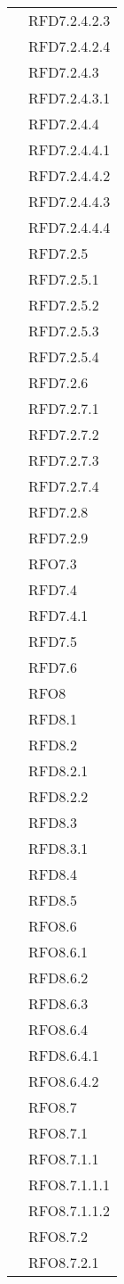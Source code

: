 \begin{longtable}{|>{\centering}m{10cm}|m{3cm}<{\centering}|}
& RFD7.2.4.2.3\\
& RFD7.2.4.2.4\\
& RFD7.2.4.3\\
& RFD7.2.4.3.1\\
& RFD7.2.4.4\\
& RFD7.2.4.4.1\\
& RFD7.2.4.4.2\\
& RFD7.2.4.4.3\\
& RFD7.2.4.4.4\\
& RFD7.2.5\\
& RFD7.2.5.1\\
& RFD7.2.5.2\\
& RFD7.2.5.3\\
& RFD7.2.5.4\\
& RFD7.2.6\\
& RFD7.2.7.1\\
& RFD7.2.7.2\\
& RFD7.2.7.3\\
& RFD7.2.7.4\\
& RFD7.2.8\\
& RFD7.2.9\\
& RFO7.3\\
& RFD7.4\\
& RFD7.4.1\\
& RFD7.5\\
& RFD7.6\\
& RFO8\\
& RFD8.1\\
& RFD8.2\\
& RFD8.2.1\\
& RFD8.2.2\\
& RFD8.3\\
& RFD8.3.1\\
& RFD8.4\\
& RFD8.5\\
& RFO8.6\\
& RFO8.6.1\\
& RFD8.6.2\\
& RFD8.6.3\\
& RFO8.6.4\\
& RFD8.6.4.1\\
& RFO8.6.4.2\\
& RFO8.7\\
& RFO8.7.1\\
& RFO8.7.1.1\\
& RFO8.7.1.1.1\\
& RFO8.7.1.1.2\\
& RFO8.7.2\\
& RFO8.7.2.1\\

\end{longtable}
